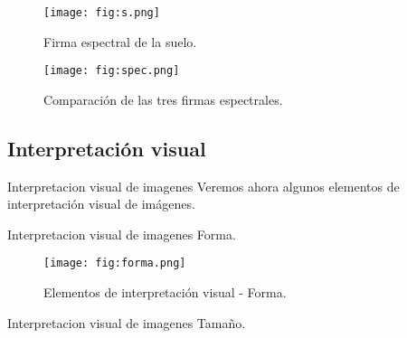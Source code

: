 \begin{frame}{}
  \begin{figure}
    \centering
    \texttt{[image: fig:s.png]}
    \caption{Firma espectral de la suelo.}
    \label{}
  \end{figure}
\end{frame}

\begin{frame}{}
  \begin{figure}
    \centering
    \texttt{[image: fig:spec.png]}
    \caption{Comparación de las tres firmas espectrales.}
    \label{}
  \end{figure}
\end{frame}
\subsection{Interpretación visual}

\begin{frame}{}
    \begin{block}{Interpretacion visual de imagenes}
       Veremos ahora algunos elementos de interpretación visual de imágenes.

    \end{block}
\end{frame}


\begin{frame}{}
    \begin{block}{Interpretacion visual de imagenes}
      Forma.

    \end{block}
\end{frame}

\begin{frame}{}
  \begin{figure}
    \centering
    \texttt{[image: fig:forma.png]}
    \caption{Elementos de interpretación visual - Forma.}
    \label{}
  \end{figure}
\end{frame}


\begin{frame}{}
    \begin{block}{Interpretacion visual de imagenes}
     Tamaño.

    \end{block}
\end{frame}

